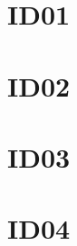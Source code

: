 \documentclass[a4paper,12pt]{article}
\begin{document}
\boldmath

\section*{ID01}


\newpage
\section*{ID02}


\newpage
\section*{ID03}


\newpage
\section*{ID04}


\unboldmath
\end{document}
